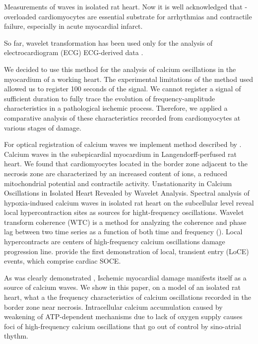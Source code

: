 \documentclass{biophys-new}
\begin{document}
Measurements of  waves in isolated rat heart.
Now it is well acknowledged that  - overloaded cardiomyocytes are essential substrate for arrhythmias and contractile failure, especially in acute myocardial infarct.

So far, wavelet transformation has been used only for the analysis of electrocardiogram (ECG) ECG-derived data \cite{sharma2017use}.

We decided to use this method for the analysis of calcium oscillations in the myocardium of a working heart.
The experimental limitations of the method used allowed us to register 100 seconds of the signal.
We cannot register a signal of sufficient duration to fully trace the evolution of frequency-amplitude characteristics in a pathological ischemic process.
Therefore, we applied a comparative analysis of these characteristics recorded from cardiomyocytes at various stages of damage.

For optical registration of calcium waves we implement method described by \cite{matsuura2018intravital}.
Calcium waves in the subepicardial myocardium in Langendorff-perfused rat heart.
We found that cardiomyocytes located in the border zone adjacent to the necrosis zone are characterized by an increased content of  ions, a reduced mitochondrial potential and contractile activity.
Unstationarity in Calcium Oscillations in Isolated Heart Revealed by Wavelet Analysis.
Spectral analysis of hypoxia-indused calcium waves in isolated rat heart on the subcellular level reveal local hypercontraction sites as sources for hight-frequency oscillations.
Wavelet transform coherence (WTC) is a method for analyzing the coherence and phase lag between two time series as a function of both time and frequency (\cite{chang2010time}).
Local hypercontracts are centers of high-frequency calcium oscillations
damage progression line.
\cite{bonilla2019enhancement} provide the first demonstration of local, transient  entry
(LoCE) events, which comprise cardiac SOCE.

As was clearly demonstrated \cite{matsuura2018intravital},
Ischemic myocardial damage manifests itself as a source of calcium waves.
We show in this paper, on a model of an isolated rat heart, what a the frequency characteristics of calcium oscillations recorded in the border zone near necrosis.
Intracellular calcium accumulation caused by weakening of ATP-dependent mechanisms due to lack of oxygen supply causes foci of high-frequency calcium oscillations that go out of control by sino-atrial thythm.
\end{document}
